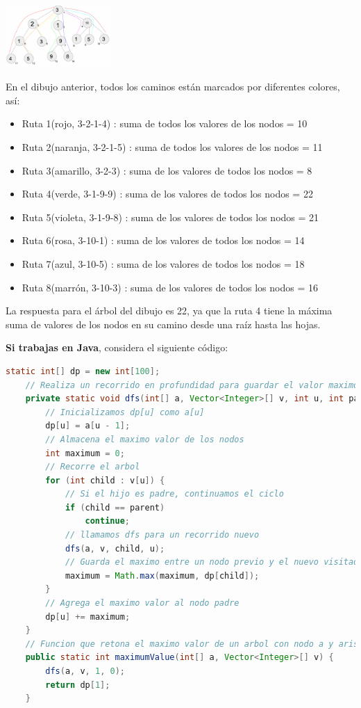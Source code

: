 \documentclass[10 pt]{article}
\begin{document}
\begin{center}
\includegraphics[width=0.3\textwidth]{Tree.png}
\end{center}

En el dibujo anterior, todos los caminos están marcados por diferentes colores, así:

\begin{itemize}[noitemsep]
\item Ruta 1(rojo, 3-2-1-4) : suma de todos los valores de los nodos = 10 
\item Ruta 2(naranja, 3-2-1-5) : suma de todos los valores de los nodos = 11 
\item Ruta 3(amarillo, 3-2-3) : suma de los valores de todos los nodos = 8 
\item Ruta 4(verde, 3-1-9-9) : suma de los valores de todos los nodos = 22 
\item Ruta 5(violeta, 3-1-9-8) : suma de los valores de todos los nodos = 21 
\item Ruta 6(rosa, 3-10-1) : suma de los valores de todos los nodos = 14 
\item Ruta 7(azul, 3-10-5) : suma de los valores de todos los nodos = 18 
\item Ruta 8(marrón, 3-10-3) : suma de los valores de todos los nodos = 16 
\end{itemize}

La respuesta para el árbol del dibujo es 22, ya que la ruta 4 tiene la máxima suma de valores de los nodos en su camino desde una raíz hasta las hojas. 

\hspace{1cm}

\textbf{Si trabajas en Java}, considera el siguiente código:

{\footnotesize
\begin{lstlisting}[language = java]
    static int[] dp = new int[100];
    // Realiza un recorrido en profundidad para guardar el valor maximo en dp[]
    private static void dfs(int[] a, Vector<Integer>[] v, int u, int parent){ 
        // Inicializamos dp[u] como a[u]
        dp[u] = a[u - 1];
        // Almacena el maximo valor de los nodos
        int maximum = 0;
        // Recorre el arbol
        for (int child : v[u]) {            
            // Si el hijo es padre, continuamos el ciclo
            if (child == parent)
                continue;
            // llamamos dfs para un recorrido nuevo
            dfs(a, v, child, u);            
            // Guarda el maximo entre un nodo previo y el nuevo visitado
            maximum = Math.max(maximum, dp[child]);
        }        
        // Agrega el maximo valor al nodo padre
        dp[u] += maximum;
    }
    // Funcion que retona el maximo valor de un arbol con nodo a y aristas v
    public static int maximumValue(int[] a, Vector<Integer>[] v) {
        dfs(a, v, 1, 0);
        return dp[1];
    }
\end{lstlisting}
}
\end{document}
